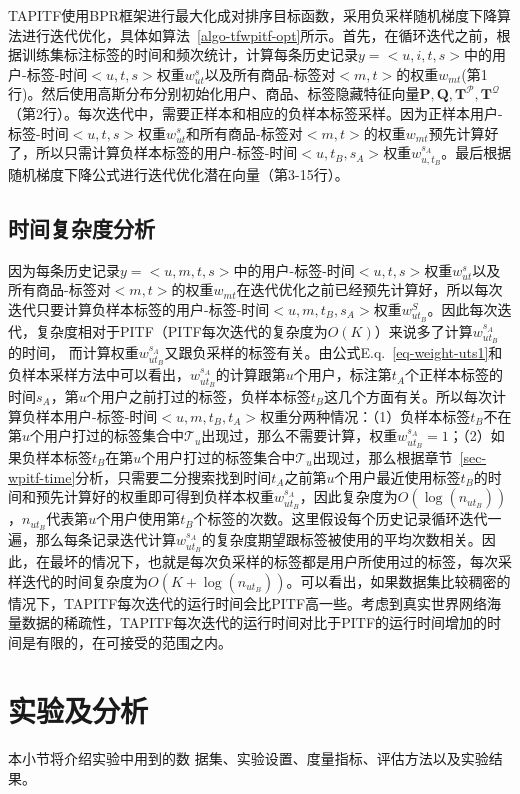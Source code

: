 TAPITF使用BPR框架进行最大化成对排序目标函数，采用负采样随机梯度下降算法进行迭代优化，具体如算法~\ref{algo-tfwpitf-opt}所示。首先，在循环迭代之前，根据训练集标注标签的时间和频次统计，计算每条历史记录$y=<u,i,t,s>$中的用户-标签-时间$<u,t,s>$权重$w_{ut}^s$以及所有商品-标签对$<m,t>$的权重$w_{mt}$(第1行)。然后使用高斯分布分别初始化用户、商品、标签隐藏特征向量$\mathbf{P}, \mathbf{Q}, \mathbf{T}^\mathcal{P}, \mathbf{T}^\mathcal{Q}$（第2行）。每次迭代中，需要正样本和相应的负样本标签采样。因为正样本用户-标签-时间$<u,t,s>$权重$w_{ut}^s$和所有商品-标签对$<m,t>$的权重$w_{mt}$预先计算好了，所以只需计算负样本标签的用户-标签-时间$<u,t_B, s_A>$权重$w_{u,t_{B}}^{s_A}$。最后根据随机梯度下降公式进行迭代优化潜在向量（第3-15行）。


\subsection{时间复杂度分析}
\label{subsec-wpitf-timeAnalysis}
因为每条历史记录$y=<u,m,t,s>$中的用户-标签-时间$<u,t,s>$权重$w_{ut}^s$以及所有商品-标签对$<m, t>$的权重$w_{mt}$在迭代优化之前已经预先计算好，所以每次迭代只要计算负样本标签的用户-标签-时间$<u,m,t_B,s_A>$权重$w_{ut_B}^S$。因此每次迭代，复杂度相对于PITF（PITF每次迭代的复杂度为$O(K)$）来说多了计算$w_{ut_B}^{s_A}$的时间， 而计算权重$w_{ut_B}^{s_A}$又跟负采样的标签有关。由公式E.q.~\ref{eq-weight-uts1}和负样本采样方法中可以看出，$w_{ut_B}^{s_A}$的计算跟第$u$个用户，标注第$t_A$个正样本标签的时间$s_A$，第$u$个用户之前打过的标签，负样本标签$t_B$这几个方面有关。所以每次计算负样本用户-标签-时间$<u,m,t_B,t_A>$权重分两种情况：（1）负样本标签$t_B$不在第$u$个用户打过的标签集合中$\mathcal{T}_u$出现过，那么不需要计算，权重$w_{ut_B}^{s_A}=1$；（2）如果负样本标签$t_B$在第$u$个用户打过的标签集合中$\mathcal{T}_u$出现过，那么根据章节~\ref{sec-wpitf-time}分析，只需要二分搜索找到时间$t_A$之前第$u$个用户最近使用标签$t_B$的时间和预先计算好的权重即可得到负样本权重$w_{ut_B}^{s_A}$，因此复杂度为$O(\log(n_{ut_B}))$，$n_{ut_B}$代表第$u$个用户使用第$t_B$个标签的次数。这里假设每个历史记录循环迭代一遍，那么每条记录迭代计算$w_{ut_B}^{s_A}$的复杂度期望跟标签被使用的平均次数相关。因此，在最坏的情况下，也就是每次负采样的标签都是用户所使用过的标签，每次采样迭代的时间复杂度为$O(K+\log(n_{ut_B}))$。可以看出，如果数据集比较稠密的情况下，TAPITF每次迭代的运行时间会比PITF高一些。考虑到真实世界网络海量数据的稀疏性，TAPITF每次迭代的运行时间对比于PITF的运行时间增加的时间是有限的，在可接受的范围之内。

\section{实验及分析}
\label{sec-wpitf-exp}
本小节将介绍实验中用到的数 据集、实验设置、度量指标、评估方法以及实验结果。

